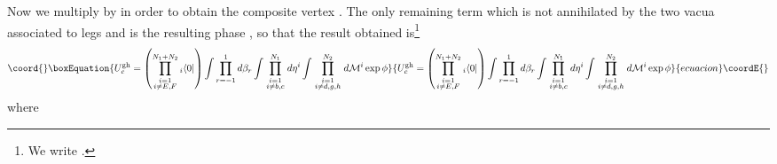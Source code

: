 \documentclass[a4paper,11pt]{article}
\begin{document}
Now we multiply \coordHE{} by \coordHE{} in order to obtain the composite vertex \coordHE{}. The only remaining term which is not annihilated by the two vacua associated to legs \coordHE{} and \coordHE{} is the resulting phase \myHighlight{$\phi $}\coordHE{}, so that the result obtained is\footnote{We write \coordHE{}.}
\begin{equation}\coord{}\boxEquation{
U_c^{\rm gh}=\left( \prod_{\scriptstyle i=1\atop \scriptstyle i\neq E,F}^{N_1+N_2}{ }_i\langle 0|\right) \int \prod_{r=-1}^1d\beta _r\int \prod_{\scriptstyle i=1\atop \scriptstyle i\neq b,c}^{N_1}d\eta ^i\int \prod_{\scriptstyle i=1\atop \scriptstyle i\neq d,g,h}^{N_2}d{\cal M}^i\exp \phi 
}{
U_c^{\rm gh}=\left( \prod_{\scriptstyle i=1\atop \scriptstyle i\neq E,F}^{N_1+N_2}{ }_i\langle 0|\right) \int \prod_{r=-1}^1d\beta _r\int \prod_{\scriptstyle i=1\atop \scriptstyle i\neq b,c}^{N_1}d\eta ^i\int \prod_{\scriptstyle i=1\atop \scriptstyle i\neq d,g,h}^{N_2}d{\cal M}^i\exp \phi 
}{ecuacion}\coordE{}\end{equation}
where
\end{document}
